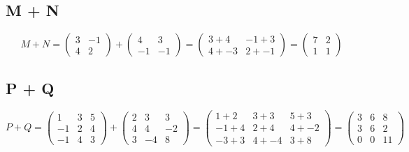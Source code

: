\documentclass[a4paper,12pt]{article}
\begin{document}
    \subsection{M + N}
      \begin{equation}
        M + N =
        \begin{pmatrix}
          3 & -1\\
          4 &  2
        \end{pmatrix}
        +
        \begin{pmatrix}
           4 &  3\\
          -1 & -1
        \end{pmatrix}
        =
        \begin{pmatrix}
          3 +  4 & -1 +  3\\
          4 + -3 &  2 + -1
        \end{pmatrix}
        =
        \begin{pmatrix}
          7 & 2\\
          1 & 1
        \end{pmatrix}
      \end{equation}
    \subsection{P + Q}
      \begin{equation}
        P + Q =
        \begin{pmatrix}
           1 & 3 & 5\\
          -1 & 2 & 4\\
          -1 & 4 & 3
        \end{pmatrix}
        +
        \begin{pmatrix}
          2 & 3 & 3\\
          4 & 4 & -2\\
          3 & -4 & 8
        \end{pmatrix}
        =
        \begin{pmatrix}
          1 + 2 & 3 + 3 & 5 + 3\\
          -1 + 4 & 2 + 4 & 4 + -2\\
          -3 + 3 & 4 + -4 & 3 + 8
        \end{pmatrix}
        =
        \begin{pmatrix}
          3 & 6 & 8\\
          3 & 6 & 2\\
          0 & 0 & 11
        \end{pmatrix}
      \end{equation}
\end{document}
